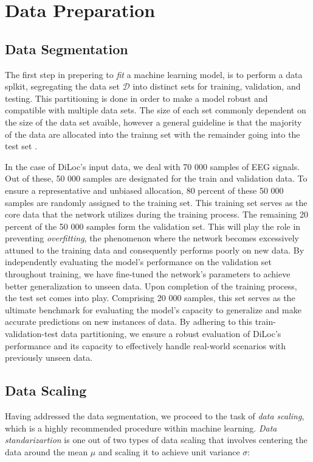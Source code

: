 \documentclass[a4paper, UKenglish, 11pt]{uiomaster}
\begin{document}
\section{Data Preparation}
\subsection{Data Segmentation}

The first step in prepering to \emph{fit} a machine learning model, is to perform a data splkit, segregating the data set $\mathcal{D}$ into distinct sets for training, validation, and testing. This partitioning is done in order to make a model robust and compatible with multiple data sets. The size of each set commonly dependent on the size of the data set avaible, however a general guideline is that the majority of the data are allocated into the trainng set with the remainder going into the test set \cite{mehta2019high}.

In the case of DiLoc's input data, we deal with 70 000 samples of EEG signals. Out of these, 50 000 samples are designated for the train and validation data. To ensure a representative and unbiased allocation, 80 percent of these 50 000 samples are randomly assigned to the training set. This training set serves as the core data that the network utilizes during the training process. The remaining 20 percent of the 50 000 samples form the validation set. This will play the role in preventing \emph{overfitting}, the phenomenon where the network becomes excessively attuned to the training data and consequently performs poorly on new data. By independently evaluating the model's performance on the validation set throughout training, we have fine-tuned the network's parameters to achieve better generalization to unseen data.
Upon completion of the training process, the test set comes into play. Comprising 20 000 samples, this set serves as the ultimate benchmark for evaluating the model's capacity to generalize and make accurate predictions on new instances of data. By adhering to this train-validation-test data partitioning, we ensure a robust evaluation of DiLoc's performance and its capacity to effectively handle real-world scenarios with previously unseen data.

\subsection{Data Scaling}
Having addressed the data segmentation, we proceed to the task of \emph{data scaling}, which is a highly recommended procedure within machine learning. \emph{Data standarizartion} is one out of two types of data scaling that involves centering the data around the mean $\mu$ and scaling it to achieve unit variance $\sigma$:
\end{document}
